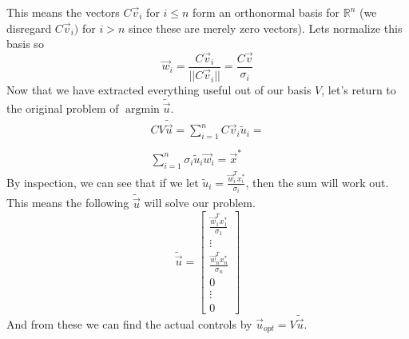 \documentclass{article}
\DeclareMathOperator*{\argmin}{argmin}
\begin{document}
This means the vectors $C\vec{v}_i$ for $i \le n$ form an orthonormal basis for $\mathbb{R}^n$ (we disregard $C\vec{v}_i)$ for $i > n$ since these are merely zero vectors).
Lets normalize this basis so $$\vec{w}_i=\frac{C\vec{v}_i}{||C\vec{v}_i||}=\frac{C\vec{v}}{\sigma_i}$$
Now that we have extracted everything useful out of our basis $V$, let's return to the original problem of $\argmin{\tilde{\vec{u}}}$.
\[
    \begin{array}{c}
        CV\tilde{\vec{u}}=\sum_{i=1}^{n}{C\vec{v}_i\tilde{u}_i} =\\\\
        \sum_{i=1}^{n}{\sigma_i\tilde{u}_i\vec{w}_i} = \vec{x}^*
    \end{array}
\]
By inspection, we can see that if we let $\tilde{u}_i=\frac{\vec{w}^T_ix^*_i}{\sigma_i}$, then the sum will work out.
This means the following $\tilde{\vec{u}}$ will solve our problem.
\[
    \tilde{\vec{u}} = \left[
        \begin{array}{c}
            \frac{\vec{w}^T_1x^*_1}{\sigma_1}\\
            \vdots\\
            \frac{\vec{w}^T_nx^*_n}{\sigma_n}\\
            0\\
            \vdots\\
            0
        \end{array}
    \right]
\]
And from these we can find the actual controls by $\vec{u}_{opt}=V\tilde{\vec{u}}$.
\end{document}
